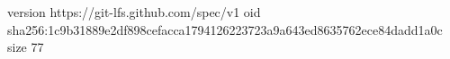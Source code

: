 version https://git-lfs.github.com/spec/v1
oid sha256:1c9b31889e2df898cefacca1794126223723a9a643ed8635762ece84dadd1a0c
size 77
